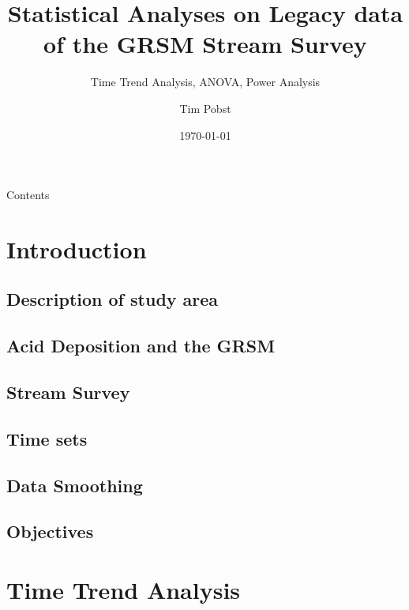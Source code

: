 \documentclass[svgnames,smaller]{beamer}
\title[Statistical Analysis] %
{Statistical Analyses on Legacy data of the GRSM Stream Survey}
\subtitle
{Time Trend Analysis, ANOVA, Power Analysis} %
\author[Pobst, Tim] %
{Tim Pobst}
\institute[University of Tennesssee Knoxville] %
{Department of Civil and Environmental Engineering\\
University of Tennessee}
\date[Thesis Defense] %
{\today}
\begin{document}
\begin{frame}
  \titlepage
\end{frame}

\begin{frame}{Contents}
  \tableofcontents
\end{frame}
\section{Introduction}

	\subsection{Description of study area}
		

	\subsection{Acid Deposition and the GRSM}
		

	\subsection{Stream Survey}
		

		

	\subsection{Time sets}
		
			
	\subsection{Data Smoothing}
		

	\subsection{Objectives}
		

\section{Time Trend Analysis}
\end{document}

